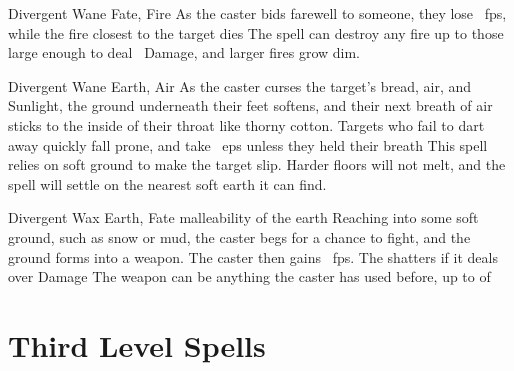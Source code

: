 \begin{multicols}{2}
  {Divergent}%
  {Wane}%
  {Fate, Fire}%
  {}%
  {As the caster bids farewell to someone, they lose \showDam~\glspl{fp}, while the fire closest to the target dies}%
  {
  The spell can destroy any fire up to those large enough to deal \showDam\ Damage, and larger fires grow dim.}

  {Divergent}%
  {Wane}%
  {Earth, Air}%
  {}%
  {As the caster curses the target's bread, air, and Sunlight, the ground underneath their feet softens, and their next breath of air sticks to the inside of their throat like thorny cotton.
  Targets who fail to dart away quickly fall prone, and take ~\glspl{ep} unless they held their breath}%
  {
  This spell relies on soft ground to make the target slip.
  Harder floors will not melt, and the spell will settle on the nearest soft earth it can find.}

  {Divergent}%
  {Wax}%
  {Earth, Fate}%
  {malleability of the earth}%
  {Reaching into some soft ground, such as snow or mud, the caster begs for a chance to fight, and the ground forms into a weapon.
  The caster then gains ~\glspl{fp}.
  The shatters if it deals over  Damage}%
  {
  The weapon can be anything the caster has used before, up to  of }

\end{multicols}

\section{Third Level Spells}

